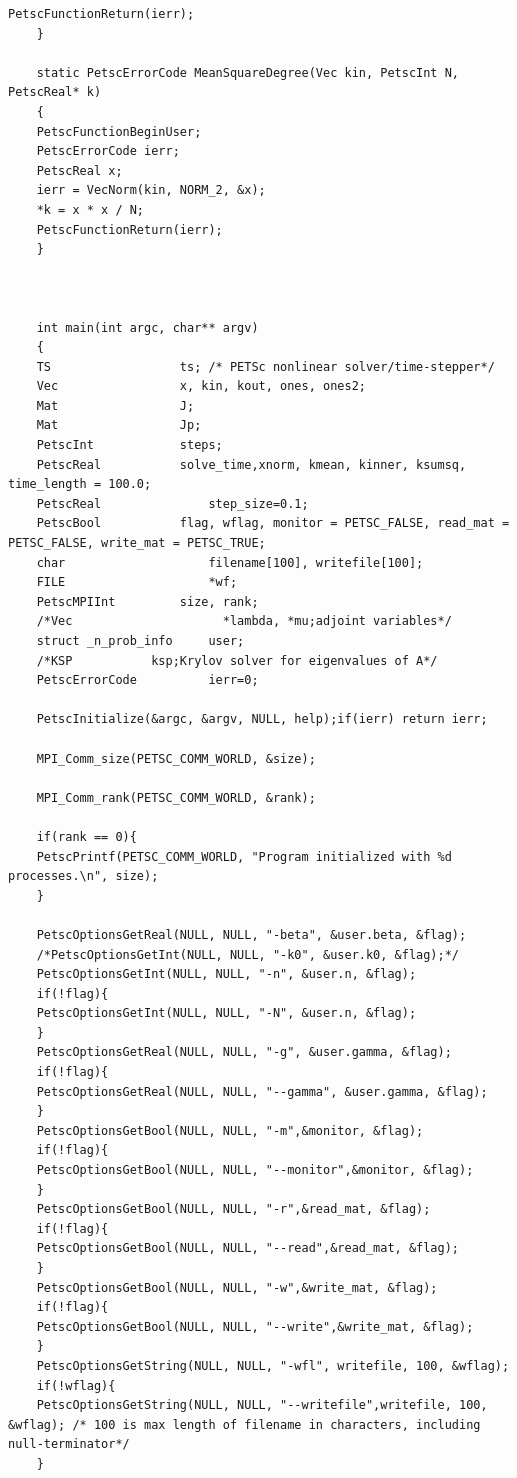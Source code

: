 \documentclass[]{article}
\begin{document}
\begin{Verbatim}[xleftmargin=-5cm]
	PetscFunctionReturn(ierr);
	}
	
	static PetscErrorCode MeanSquareDegree(Vec kin, PetscInt N, PetscReal* k)
	{
	PetscFunctionBeginUser;
	PetscErrorCode ierr;
	PetscReal x;
	ierr = VecNorm(kin, NORM_2, &x);
	*k = x * x / N;
	PetscFunctionReturn(ierr);
	}
	
	
	
	int main(int argc, char** argv)
	{
	TS             		ts; /* PETSc nonlinear solver/time-stepper*/            
	Vec            		x, kin, kout, ones, ones2;
	Mat            		J;   
	Mat            		Jp;
	PetscInt       		steps;
	PetscReal      		solve_time,xnorm, kmean, kinner, ksumsq, time_length = 100.0;
	PetscReal               step_size=0.1;
	PetscBool      		flag, wflag, monitor = PETSC_FALSE, read_mat = PETSC_FALSE, write_mat = PETSC_TRUE;
	char                    filename[100], writefile[100];
	FILE                    *wf;
	PetscMPIInt    		size, rank;
	/*Vec                     *lambda, *mu;adjoint variables*/
	struct _n_prob_info 	user;
	/*KSP			ksp;Krylov solver for eigenvalues of A*/
	PetscErrorCode          ierr=0;
	
	PetscInitialize(&argc, &argv, NULL, help);if(ierr) return ierr;
	
	MPI_Comm_size(PETSC_COMM_WORLD, &size);
	
	MPI_Comm_rank(PETSC_COMM_WORLD, &rank);
	
	if(rank == 0){
	PetscPrintf(PETSC_COMM_WORLD, "Program initialized with %d processes.\n", size);
	}
	
	PetscOptionsGetReal(NULL, NULL, "-beta", &user.beta, &flag);
	/*PetscOptionsGetInt(NULL, NULL, "-k0", &user.k0, &flag);*/
	PetscOptionsGetInt(NULL, NULL, "-n", &user.n, &flag);
	if(!flag){
	PetscOptionsGetInt(NULL, NULL, "-N", &user.n, &flag);
	}
	PetscOptionsGetReal(NULL, NULL, "-g", &user.gamma, &flag);
	if(!flag){
	PetscOptionsGetReal(NULL, NULL, "--gamma", &user.gamma, &flag);
	}
	PetscOptionsGetBool(NULL, NULL, "-m",&monitor, &flag);
	if(!flag){
	PetscOptionsGetBool(NULL, NULL, "--monitor",&monitor, &flag);
	}
	PetscOptionsGetBool(NULL, NULL, "-r",&read_mat, &flag);
	if(!flag){
	PetscOptionsGetBool(NULL, NULL, "--read",&read_mat, &flag);
	}
	PetscOptionsGetBool(NULL, NULL, "-w",&write_mat, &flag);
	if(!flag){
	PetscOptionsGetBool(NULL, NULL, "--write",&write_mat, &flag);
	}
	PetscOptionsGetString(NULL, NULL, "-wfl", writefile, 100, &wflag);
	if(!wflag){
	PetscOptionsGetString(NULL, NULL, "--writefile",writefile, 100, &wflag); /* 100 is max length of filename in characters, including null-terminator*/
	}
	

\end{Verbatim}
\end{document}
